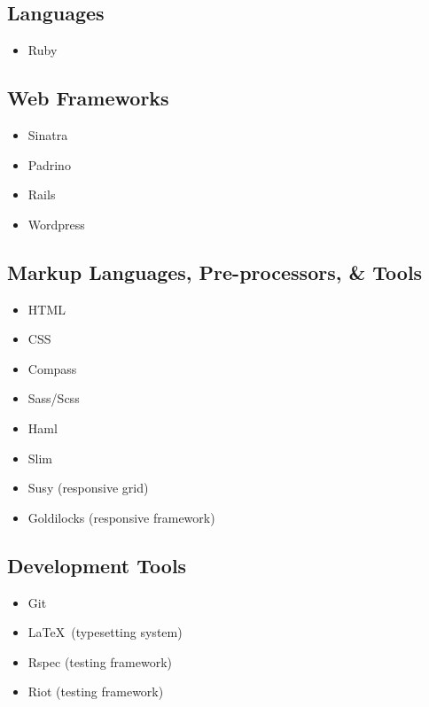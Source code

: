 \documentclass{article}
\begin{document}
\begin{multicols}{3}
\subsection{Languages} %
\label{sub:Languages}

\begin{itemize}
  \item Ruby
\end{itemize}

\subsection{Web Frameworks} %
\label{sub:Web Frameworks}

\begin{itemize}
  \item Sinatra
  \item Padrino
  \item Rails
  \item Wordpress
\end{itemize}

\subsection{Markup Languages, Pre-processors, \& Tools} %
\label{sub:Markup Languages, Pre-processors, \& Tools}

\begin{itemize}
  \item HTML
  \item CSS
  \item Compass
  \item Sass/Scss
  \item Haml
  \item Slim
  \item Susy (responsive grid)
  \item Goldilocks (responsive framework)
\end{itemize}

\subsection{Development Tools} %
\label{sub:Development Tools}

\begin{itemize}
  \item Git
  \item \LaTeX\ (typesetting system)
  \item Rspec (testing framework)
  \item Riot (testing framework)
\end{itemize}

\end{multicols}
\end{document}
